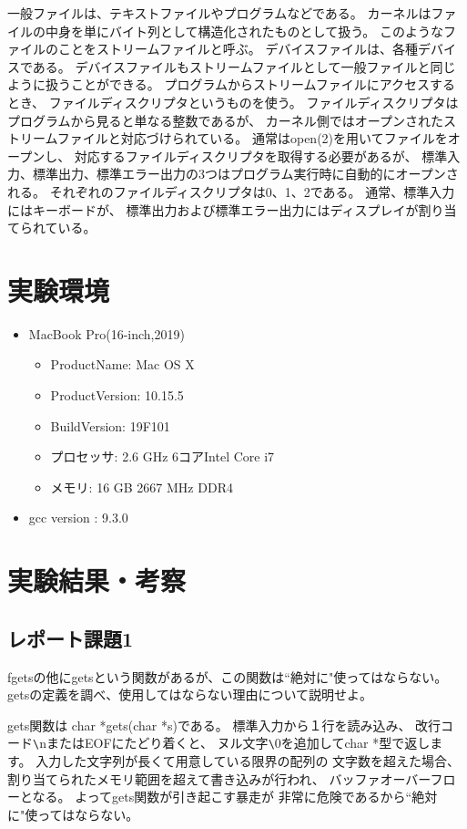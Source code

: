 \documentclass[12pt]{jarticle}
\begin{document}
一般ファイルは、テキストファイルやプログラムなどである。
カーネルはファイルの中身を単にバイト列として構造化されたものとして扱う。
このようなファイルのことをストリームファイルと呼ぶ。
デバイスファイルは、各種デバイスである。
デバイスファイルもストリームファイルとして一般ファイルと同じように扱うことができる。
プログラムからストリームファイルにアクセスするとき、
ファイルディスクリプタというものを使う。
ファイルディスクリプタはプログラムから見ると単なる整数であるが、
カーネル側ではオープンされたストリームファイルと対応づけられている。
通常はopen(2)を用いてファイルをオープンし、
対応するファイルディスクリプタを取得する必要があるが、
標準入力、標準出力、標準エラー出力の3つはプログラム実行時に自動的にオープンされる。
それぞれのファイルディスクリプタは0、1、2である。
通常、標準入力にはキーボードが、
標準出力および標準エラー出力にはディスプレイが割り当てられている。

\clearpage
\section{実験環境}
\begin{itemize}
    \item MacBook Pro(16-inch,2019)
          \begin{itemize}
              \item ProductName: Mac OS X
              \item ProductVersion:	10.15.5
              \item BuildVersion: 19F101
              \item プロセッサ: 2.6 GHz 6コアIntel Core i7
              \item メモリ: 16 GB 2667 MHz DDR4
          \end{itemize}
    \item gcc version : 9.3.0
\end{itemize}

\section{実験結果・考察}
\subsection{レポート課題1}
\begin{shadebox}
    fgetsの他にgetsという関数があるが、この関数は``絶対に"使ってはならない。
    getsの定義を調べ、使用してはならない理由について説明せよ。
\end{shadebox}
gets関数は char *gets(char *s)である。
標準入力から１行を読み込み、
改行コード\verb|\|nまたはEOFにたどり着くと、
ヌル文字\verb|\|0を追加してchar *型で返します。
入力した文字列が長くて用意している限界の配列の
文字数を超えた場合、割り当てられたメモリ範囲を超えて書き込みが行われ、
バッファオーバーフローとなる。
よってgets関数が引き起こす暴走が
非常に危険であるから``絶対に"使ってはならない。
\end{document}

